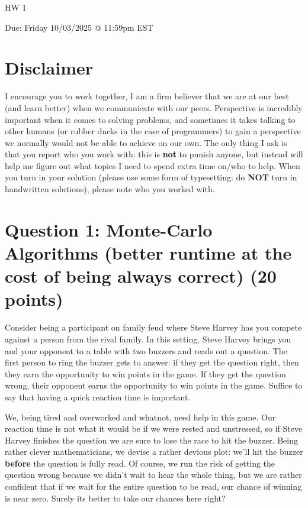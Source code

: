 \documentclass[11pt]{article}
\newcommand{\question}[1]{\section*{\normalsize #1}}
\begin{document}
\begin{center}
    {\Large \textsc{HW 1}}
\end{center}
\begin{center}
    Due: Friday 10/03/2025 @ 11:59pm EST
\end{center}

\section*{\textbf{Disclaimer}}
I encourage you to work together, I am a firm believer that we are at our best (and learn better) when we communicate with our peers. Perspective is incredibly important when it comes to solving problems, and sometimes it takes talking to other humans (or rubber ducks in the case of programmers) to gain a perspective we normally would not be able to achieve on our own. The only thing I ask is that you report who you work with: this is \textbf{not} to punish anyone, but instead will help me figure out what topics I need to spend extra time on/who to help. When you turn in your solution (please use some form of typesetting: do \textbf{NOT} turn in handwritten solutions), please note who you worked with.



\question{Question 1: Monte-Carlo Algorithms (better runtime at the cost of being always correct) (20 points)}
Consider being a participant on family feud where Steve Harvey has you compete against a person from the rival family. In this setting, Steve Harvey brings you and your opponent to a table with two buzzers and reads out a question. The first person to ring the buzzer gets to answer: if they get the question right, then they earn the opportunity to win points in the game. If they get the question wrong, their opponent earns the opportunity to win points in the game. Suffice to say that having a quick reaction time is important.\newline

\noindent We, being tired and overworked and whatnot, need help in this game. Our reaction time is not what it would be if we were rested and unstressed, so if Steve Harvey finishes the question we are sure to lose the race to hit the buzzer. Being rather clever mathematicians, we devise a rather devious plot: we'll hit the buzzer \textbf{before} the question is fully read. Of course, we run the risk of getting the question wrong because we didn't wait to hear the whole thing, but we are rather confident that if we wait for the entire question to be read, our chance of winning is near zero. Surely its better to take our chances here right?\newline
\end{document}
